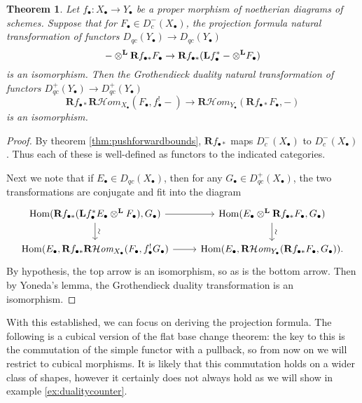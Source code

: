 \documentclass[proquest]{uwthesis}[2014/11/13]
\newtheorem{theorem}{Theorem}[section]
\theoremstyle{definition}
\DeclareMathOperator{\Hom}{Hom}
\newcommand{\cHom}{\mathcal{H} \textit{om}}
\newcommand{\bL}{\textbf{L}}
\newcommand{\bR}{\textbf{R}}
\newcommand{\otimesL}{\otimes^{\bf L}}
\begin{document}
\begin{theorem}
	Let $f_\bullet : X_\bullet \rightarrow Y_\bullet$ be a proper morphism of noetherian diagrams of schemes.
	Suppose that for $F_\bullet \in D_{c}^-(X_\bullet)$, the projection formula natural transformation of functors $D_{qc}(Y_\bullet) \rightarrow D_{qc}(Y_\bullet)$
	\[
		- \otimesL \bR f_{\bullet *} F_\bullet \rightarrow \bR f_{\bullet *}(\bL f_\bullet^* - \otimesL F_\bullet)
	\]
	is an isomorphism.
	Then the Grothendieck duality natural transformation of functors $D_{qc}^+(Y_\bullet) \rightarrow D_{qc}^+(Y_\bullet)$
	\[
		\bR f_{\bullet *} \bR \cHom_{X_\bullet} (F_\bullet, f_\bullet^! -) \rightarrow \bR \cHom_{Y_\bullet} (\bR f_{\bullet *} F_\bullet, -)
	\]
	is an isomorphism.
\end{theorem}
\begin{proof}
	By theorem \ref{thm:pushforwardbounds}, $\bR f_{\bullet *}$ maps $D^-_{c}(X_\bullet)$ to $D_c^-(X_\bullet)$.
	Thus each of these is well-defined as functors to the indicated categories.
	
	Next we note that if $E_\bullet \in D_{qc}(X_\bullet)$, then for any $G_\bullet \in D_{qc}^+(X_\bullet)$, the two transformations are conjugate and fit into the diagram
	\[
	\begin{tikzcd}
		\Hom(\bR f_{\bullet *}(\bL f_\bullet^* E_\bullet \otimesL F_\bullet), G_\bullet) \arrow{d}[sloped, above]{\sim} \arrow{r} & \Hom(E_\bullet \otimesL \bR f_{\bullet *} F_\bullet, G_\bullet) \arrow{d}[sloped, above]{\sim} \\
		\Hom(E_\bullet, \bR f_{\bullet *} \bR \cHom_{X_\bullet} (F_\bullet, f_\bullet^! G_\bullet) \arrow{r} & \Hom(E_\bullet, \bR \cHom_{Y_\bullet} (\bR f_{\bullet *} F_\bullet, G_\bullet)).
	\end{tikzcd}
	\]
	By hypothesis, the top arrow is an isomorphism, so as is the bottom arrow.
	Then by Yoneda's lemma, the Grothendieck duality transformation is an isomorphism.
\end{proof}

With this established, we can focus on deriving the projection formula.
The following is a cubical version of the flat base change theorem: the key to this is the commutation of the simple functor with a pullback, so from now on we will restrict to cubical morphisms.
It is likely that this commutation holds on a wider class of shapes, however it certainly does not always hold as we will show in example \ref{ex:dualitycounter}.
\end{document}
